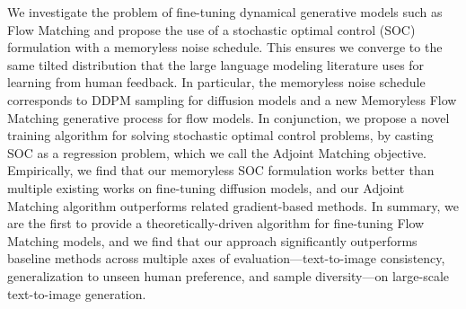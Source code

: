 \documentclass[]{fairmeta}
\let\oldaddcontentsline\addcontentsline
\newcommand{\starttocentries}{\let\addcontentsline\oldaddcontentsline}
\begin{document}
We investigate the problem of fine-tuning dynamical generative models such as Flow Matching and propose the use of a stochastic optimal control (SOC) formulation with a memoryless noise schedule. 
This ensures we converge to the same tilted distribution that the large language modeling literature uses for learning from human feedback. 
In particular, the memoryless noise schedule corresponds to DDPM sampling for diffusion models and a new Memoryless Flow Matching generative process for flow models. 
In conjunction, we propose a novel training algorithm for solving stochastic optimal control problems, by casting SOC as a regression problem, which we call the Adjoint Matching objective. 
Empirically, we find that our memoryless SOC formulation works better than multiple existing works on fine-tuning diffusion models, and our Adjoint Matching algorithm outperforms related gradient-based methods.
In summary, we are the first to provide a theoretically-driven algorithm for fine-tuning Flow Matching models, and we find that our approach significantly outperforms baseline methods across multiple axes of evaluation---text-to-image consistency, generalization to unseen human preference, and sample diversity---on large-scale text-to-image generation.




\clearpage
\newpage
\beginappendix

\tableofcontents

\starttocentries

\clearpage
\newpage



\clearpage
\newpage


\end{document}

